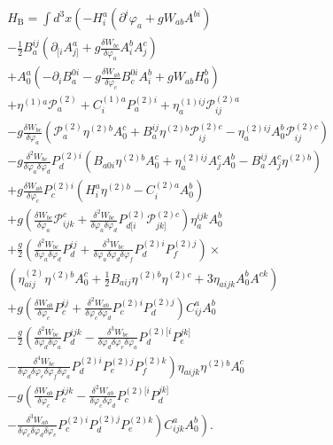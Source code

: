 \documentclass[a4paper,12pt]{article}
\begin{document}
\begin{eqnarray}
&&H_{\mathrm{B}}= \int d^{3}x\left( -H_{i}^{a}\left( \partial ^{i}\varphi
_{a}+gW_{ab}A^{bi}\right) \right.  \nonumber \\
&&-\frac{1}{2}B_{a}^{ij}\left( \partial _{[i}A_{j]}^{a}+ g\frac{\delta W_{bc}%
}{\delta \varphi _{a}}A_{i}^{b}A_{j}^{c}\right)  \nonumber \\
&&+A_{0}^{a}\left( -\partial _{i}B_{a}^{0i}- g\frac{\delta W_{ab}}{\delta
\varphi _{c}}B_{c}^{0i}A_{i}^{b}+gW_{ab}H_{0}^{b}\right)  \nonumber \\
&&+\eta ^{(1)a}\mathcal{P}_{a}^{(2)}+C_{i}^{(1)a}P_{a}^{(2)i}+ \eta
_{a}^{(1)ij}\mathcal{P}_{ij}^{(2)a}  \nonumber \\
&&-g\frac{\delta W_{bc}}{\delta \varphi _{a}}\left( \mathcal{P}%
_{a}^{(2)}\eta ^{(2)b}A_{0}^{c}+B_{a}^{ij}\eta ^{(2)b}\mathcal{P}%
_{ij}^{(2)c}-\eta _{a}^{(2)ij}A_{0}^{b}\mathcal{P}_{ij}^{(2)c}\right) 
\nonumber \\
&&-g\frac{\delta ^{2}W_{bc}}{\delta \varphi _{a}\delta \varphi _{d}}%
P_{d}^{(2)i}\left( B_{a0i}\eta ^{(2)b}A_{0}^{c}+\eta
_{a}^{(2)ij}A_{j}^{c}A_{0}^{b}-B_{a}^{ij}A_{j}^{c}\eta ^{(2)b}\right) 
\nonumber \\
&&+g\frac{\delta W_{ab}}{\delta \varphi _{c}}P_{c}^{(2)i} \left(
H_{i}^{a}\eta ^{(2)b}-C_{i}^{(2)a}A_{0}^{b}\right)  \nonumber \\
&&+g\left( \frac{\delta W_{bc}}{\delta \varphi _{a}}\mathcal{P}_{ijk}^{c}+%
\frac{\delta ^{2}W_{bc}}{\delta \varphi _{a}\delta \varphi _{d}}P_{d[i}^{(2)}%
\mathcal{P}_{jk]}^{(2)c}\right) \eta _{a}^{ijk}A_{0}^{b}  \nonumber \\
&&+\frac{g}{2}\left( \frac{\delta ^{2}W_{bc}}{\delta \varphi _{a}\delta
\varphi _{d}}P_{d}^{ij}+\frac{\delta ^{3}W_{bc}}{\delta \varphi _{a}\delta
\varphi _{d}\delta \varphi _{f}}P_{d}^{(2)i}P_{f}^{(2)j}\right) \times 
\nonumber \\
&&\left( \eta _{aij}^{(2)}\eta ^{(2)b}A_{0}^{c}+\frac{1}{2}B_{aij}\eta
^{(2)b}\eta ^{(2)c}+3\eta _{aijk}A_{0}^{b}A^{ck}\right)  \nonumber \\
&&+g\left( \frac{\delta W_{ab}}{\delta \varphi _{c}}P_{c}^{ij}+\frac{\delta
^{2}W_{ab}}{\delta \varphi _{c}\delta \varphi _{d}}P_{c}^{(2)i}P_{d}^{(2)j}%
\right) C_{ij}^{a}A_{0}^{b}  \nonumber \\
&&-\frac{g}{2}\left( \frac{\delta ^{2}W_{bc}}{\delta \varphi _{d}\delta
\varphi _{a}}P_{d}^{ijk}-\frac{\delta ^{3}W_{bc}}{\delta \varphi _{d}\delta
\varphi _{e}\delta \varphi _{a}}P_{d}^{(2)[i}P_{e}^{jk]}\right.  \nonumber \\
&&\left. -\frac{\delta ^{4}W_{bc}}{\delta \varphi _{d}\delta \varphi
_{e}\delta \varphi _{f}\delta \varphi _{a}}%
P_{d}^{(2)i}P_{e}^{(2)j}P_{f}^{(2)k}\right) \eta _{aijk}\eta ^{(2)b}A_{0}^{c}
\nonumber \\
&&-g\left( \frac{\delta W_{ab}}{\delta \varphi _{c}}P_{c}^{ijk}-\frac{\delta
^{2}W_{ab}}{\delta \varphi _{c}\delta \varphi _{d}}P_{c}^{(2)[i}P_{d}^{jk]}%
\right.  \nonumber \\
&&\left. \left. -\frac{\delta ^{3}W_{ab}}{\delta \varphi _{c}\delta \varphi
_{d}\delta \varphi _{e}}P_{c}^{(2)i}P_{d}^{(2)j}P_{e}^{(2)k}\right)
C_{ijk}^{a}A_{0}^{b}\right) .  \label{xx93}
\end{eqnarray}
\end{document}
